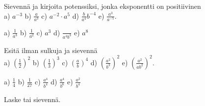 \begin{tehtavasivu}
   
    
    \begin{tehtava}
         Sievennä ja kirjoita potenssiksi, jonka eksponentti on positiivinen\\
        a) $a^{-3}$ 
        b) $\frac{a}{a^3}$ 
        c) $a^{-2}\cdot a^5$ 
        d) $\frac{b}{a^4}b^{-4}$ 
        e) $\frac{a^3}{a^{-5}}$.
        
        \begin{vastaus}
            a) $\frac{1}{a^3}$ 
            b) $\frac{1}{a^2}$ 
            c) $a^3$ 
            d) $\frac{}{a^4b^3}$ 
            e) $a^8$
        \end{vastaus}
    \end{tehtava}
    
    
    
    \begin{tehtava}
        Esitä ilman sulkuja ja sievennä \\
        a) $(\frac{1}{2})^2$ 
        b) $(\frac{1}{3})^3$ 
        c) $(\frac{a}{b})^4$ 
        d) $(\frac{a^2}{b^3})^2$ 
        e) $\left(\frac{a^2}{ab^2}\right)^2$.
        
        \begin{vastaus}
            a) $\frac{1}{4}$ 
            b) $\frac{1}{27}$ 
            c) $\frac{a^4}{b^4}$ 
            d) $\frac{a^4}{b^6}$ 
            e) $\frac{a^2}{b^4}$
        \end{vastaus}
    \end{tehtava}

Laske tai sievennä.

    \begin{tehtava}%
        \begin{alakohdatrivi}
		\end{alakohdatrivi}        
        \begin{vastaus}
        \begin{alakohdat}
        \end{alakohdat}
        \end{vastaus}
    \end{tehtava}    
    

\end{tehtavasivu}
